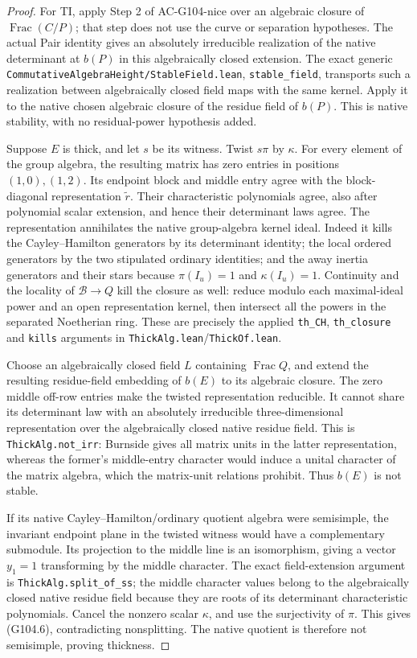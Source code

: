 \begin{proof}
For TI, apply Step 2 of AC-G104-nice over an algebraic closure
of \(\operatorname{Frac}(C/P)\); that step does not use the
curve or separation hypotheses.  The actual Pair identity gives
an absolutely irreducible realization of the native determinant
at \(b(P)\) in this algebraically closed extension.
The exact generic \texttt{CommutativeAlgebraHeight/StableField.lean},
\texttt{stable\_field}, transports such a realization between
algebraically closed field maps with the same kernel.  Apply it
to the native chosen algebraic closure of the residue field of
\(b(P)\).  This is native stability, with no residual-power
hypothesis added.

Suppose \(E\) is thick, and let \(s\) be its witness.
Twist \(s\pi\) by \(\kappa\).  For every element of the group
algebra, the resulting matrix has zero entries in positions
\((1,0),(1,2)\).  Its endpoint block and middle entry agree
with the block-diagonal representation \(\widetilde r\).
Their characteristic polynomials agree, also after polynomial
scalar extension, and hence their determinant laws agree.
The representation annihilates the native group-algebra
kernel ideal.  Indeed it kills the Cayley--Hamilton generators
by its determinant identity; the local ordered generators by
the two stipulated ordinary identities; and the away inertia
generators and their stars because \(\pi(I_u)=1\) and
\(\kappa(I_u)=1\).  Continuity and the locality of
\(\mathscr B\to Q\) kill the closure as well: reduce modulo
each maximal-ideal power and an open representation kernel,
then intersect all the powers in the separated Noetherian ring.
These are precisely the applied \texttt{th\_CH},
\texttt{th\_closure} and \texttt{kills} arguments in
\texttt{ThickAlg.lean}/\texttt{ThickOf.lean}.

Choose an algebraically closed field \(L\) containing
\(\operatorname{Frac}Q\), and extend the resulting residue-field
embedding of \(b(E)\) to its algebraic closure.  The zero middle
off-row entries make the twisted representation reducible.
It cannot share its determinant law with an absolutely irreducible
three-dimensional representation over the algebraically closed
native residue field.  This is \texttt{ThickAlg.not\_irr}:
Burnside gives all matrix units in the latter representation,
whereas the former's middle-entry character would induce a
unital character of the matrix algebra, which the matrix-unit
relations prohibit.  Thus \(b(E)\) is not stable.

If its native Cayley--Hamilton/ordinary quotient algebra were
semisimple, the invariant endpoint plane in the twisted witness
would have a complementary submodule.  Its projection to the
middle line is an isomorphism, giving a vector \(y_1=1\)
transforming by the middle character.  The exact field-extension
argument is \texttt{ThickAlg.split\_of\_ss}; the middle character
values belong to the algebraically closed native residue field
because they are roots of its determinant characteristic polynomials.
Cancel the nonzero scalar \(\kappa\), and use the surjectivity
of \(\pi\).  This gives (G104.6), contradicting nonsplitting.
The native quotient is therefore not semisimple, proving thickness.


\end{proof}
